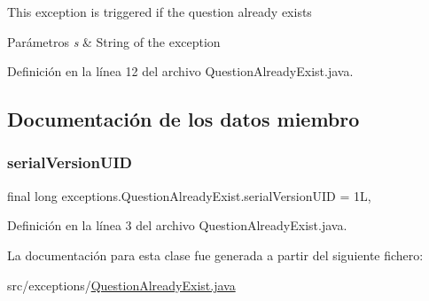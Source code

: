 This exception is triggered if the question already exists 
\begin{DoxyParams}{Parámetros}
{\em s} & String of the exception \\
\hline
\end{DoxyParams}


Definición en la línea 12 del archivo Question\+Already\+Exist.\+java.


\begin{DoxyCode}{0}

\end{DoxyCode}


\subsection{Documentación de los datos miembro}
\mbox{\label{classexceptions_1_1QuestionAlreadyExist_ad906b7497e316499971a61b39b749a94}} 
\subsubsection{\texorpdfstring{serialVersionUID}{serialVersionUID}}
{\footnotesize\ttfamily final long exceptions.\+Question\+Already\+Exist.\+serial\+Version\+U\+ID = 1L\hspace{0.3cm}{\ttfamily [static]}, {\ttfamily [private]}}



Definición en la línea 3 del archivo Question\+Already\+Exist.\+java.



La documentación para esta clase fue generada a partir del siguiente fichero\+:\begin{DoxyCompactItemize}
\item 
src/exceptions/\mbox{\hyperlink{QuestionAlreadyExist_8java}{Question\+Already\+Exist.\+java}}\end{DoxyCompactItemize}
